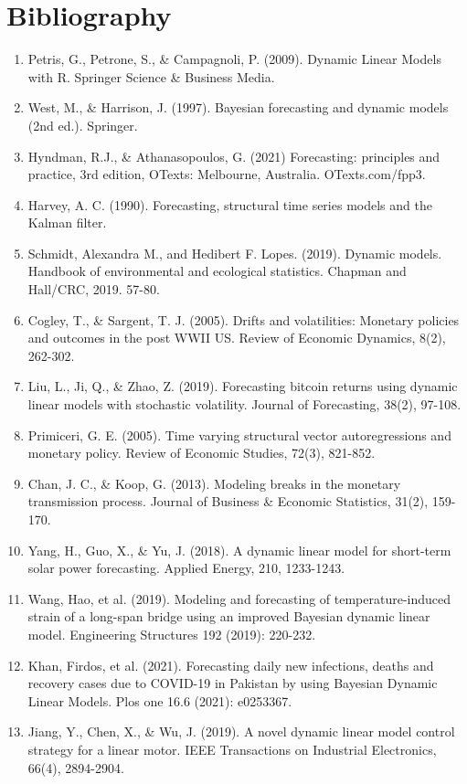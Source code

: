 \documentclass[a4paper,12pt]{article}
\begin{document}
\section{Bibliography}
\label{sec:org06d47f6}
\begin{enumerate}
\item Petris, G., Petrone, S., \& Campagnoli, P. (2009). Dynamic Linear Models with R. Springer Science \& Business Media.
\item West, M., \& Harrison, J. (1997). Bayesian forecasting and dynamic models (2nd ed.). Springer.
\item Hyndman, R.J., \& Athanasopoulos, G. (2021) Forecasting: principles and practice, 3rd edition, OTexts: Melbourne, Australia. OTexts.com/fpp3.
\item Harvey, A. C. (1990). Forecasting, structural time series models and the Kalman filter.
\item Schmidt, Alexandra M., and Hedibert F. Lopes. (2019). Dynamic models. Handbook of environmental and ecological statistics. Chapman and Hall/CRC, 2019. 57-80.
\item Cogley, T., \& Sargent, T. J. (2005). Drifts and volatilities: Monetary policies and outcomes in the post WWII US. Review of Economic Dynamics, 8(2), 262-302.
\item Liu, L., Ji, Q., \& Zhao, Z. (2019). Forecasting bitcoin returns using dynamic linear models with stochastic volatility. Journal of Forecasting, 38(2), 97-108.
\item Primiceri, G. E. (2005). Time varying structural vector autoregressions and monetary policy. Review of Economic Studies, 72(3), 821-852.
\item Chan, J. C., \& Koop, G. (2013). Modeling breaks in the monetary transmission process. Journal of Business \& Economic Statistics, 31(2), 159-170.
\item Yang, H., Guo, X., \& Yu, J. (2018). A dynamic linear model for short-term solar power forecasting. Applied Energy, 210, 1233-1243.
\item Wang, Hao, et al. (2019). Modeling and forecasting of temperature-induced strain of a long-span bridge using an improved Bayesian dynamic linear model. Engineering Structures 192 (2019): 220-232.
\item Khan, Firdos, et al. (2021). Forecasting daily new infections, deaths and recovery cases due to COVID-19 in Pakistan by using Bayesian Dynamic Linear Models. Plos one 16.6 (2021): e0253367.
\item Jiang, Y., Chen, X., \& Wu, J. (2019). A novel dynamic linear model control strategy for a linear motor. IEEE Transactions on Industrial Electronics, 66(4), 2894-2904.

\end{enumerate}
\end{document}
